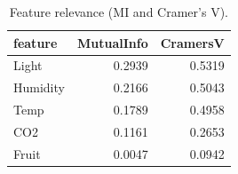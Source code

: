 \begin{table}
\caption{Feature relevance (MI and Cramer's V).}
\label{tab:relevance}
\begin{tabular}{lrr}
\toprule
feature & MutualInfo & CramersV \\
\midrule
Light & 0.2939 & 0.5319 \\
Humidity & 0.2166 & 0.5043 \\
Temp & 0.1789 & 0.4958 \\
CO2 & 0.1161 & 0.2653 \\
Fruit & 0.0047 & 0.0942 \\
\bottomrule
\end{tabular}
\end{table}
